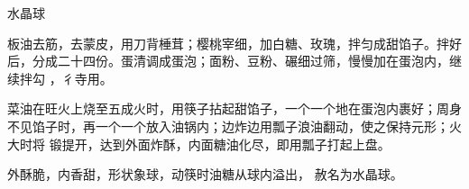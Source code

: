 \begin{recipe}{水晶球}

\ingredients


\preparation

\step 板油去筋，去蒙皮，用刀背棰茸；樱桃宰细，加白糖、玫瑰，拌匀成甜馅子。拌好
后，分成二十四份。蛋清调成蛋泡；面粉、豆粉、碾细过筛，慢慢加在蛋泡内，继续拌勾
，彳寺用。

\step 菜油在旺火上烧至五成火时，用筷子拈起甜馅子，一个一个地在蛋泡内裹好；周身
不见馅子时，再一个一个放入油锅内；边炸边用瓢子浪油翻动，使之保持元形；火大时将
锻提开，达到外面炸酥，内面糖油化尽，即用瓢子打起上盘。

\features

外酥脆，内香甜，形状象球，动筷时油糖从球内溢出， 赦名为水晶球。

\end{recipe}

